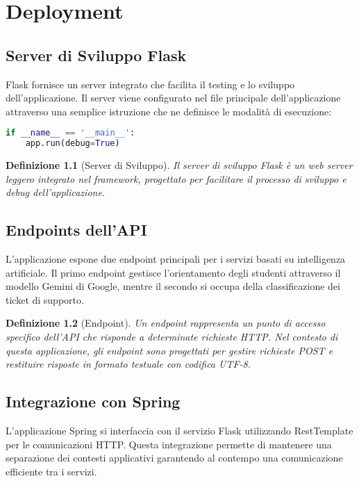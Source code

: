 \chapter{Deployment}
\newtheorem{definition}{Definizione}[chapter]

\section{Server di Sviluppo Flask}
Flask fornisce un server integrato che facilita il testing e lo sviluppo dell'applicazione. Il server viene configurato nel file principale dell'applicazione attraverso una semplice istruzione che ne definisce le modalità di esecuzione:

\begin{lstlisting}[language=Python, caption=Configurazione Server Flask]
if __name__ == '__main__':
    app.run(debug=True)
\end{lstlisting}

\begin{definition}[Server di Sviluppo]
Il server di sviluppo Flask è un web server leggero integrato nel framework, progettato per facilitare il processo di sviluppo e debug dell'applicazione.
\end{definition}

\section{Endpoints dell'API}
L'applicazione espone due endpoint principali per i servizi basati su intelligenza artificiale. Il primo endpoint gestisce l'orientamento degli studenti attraverso il modello Gemini di Google, mentre il secondo si occupa della classificazione dei ticket di supporto.
\begin{definition}[Endpoint]
Un endpoint rappresenta un punto di accesso specifico dell'API che risponde a determinate richieste HTTP. Nel contesto di questa applicazione, gli endpoint sono progettati per gestire richieste POST e restituire risposte in formato testuale con codifica UTF-8.
\end{definition}

\section{Integrazione con Spring}
L'applicazione Spring si interfaccia con il servizio Flask utilizzando RestTemplate per le comunicazioni HTTP. Questa integrazione permette di mantenere una separazione dei contesti applicativi garantendo al contempo una comunicazione efficiente tra i servizi.
\newpage

